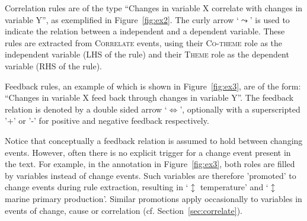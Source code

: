 \documentclass[10pt, a4paper]{article}
\newcommand{\tag}[1]{\textsc{#1}}
\begin{document}
Correlation rules are of the type ``Changes in variable X correlate with changes in variable Y'', as exemplified in Figure~\ref{fig:ex2}.
The curly arrow `$\leadsto$' is used to indicate the relation between a independent and a dependent variable.
These rules are extracted from \tag{Correlate} events, using their \tag{Co-theme} role as the independent variable (LHS of the rule) and their \tag{Theme} role as the dependent variable (RHS of the rule). 

Feedback rules, an example of which is shown in Figure~\ref{fig:ex3}, are of the form: ``Changes in variable X feed back through changes in variable Y''.
The feedback relation is denoted by a double sided arrow `$\Longleftrightarrow$', optionally with a superscripted '+' or '-' for positive and negative feedback respectively.

Notice that conceptually a feedback relation is assumed to hold between changing events.
However, often there is no explicit trigger for a change event present in the text.
For example, in the annotation in Figure~\ref{fig:ex3}, both roles are filled by variables instead of change events.
Such variables are therefore 'promoted' to change events during rule extraction, resulting in `$\updownarrow$ temperature' and `$\updownarrow$ marine primary production'.
Similar promotions apply occasionally to variables in events of change, cause or correlation (cf. Section~\ref{sec:correlate}).


\setlength{\fboxsep}{10pt}
\end{document}
